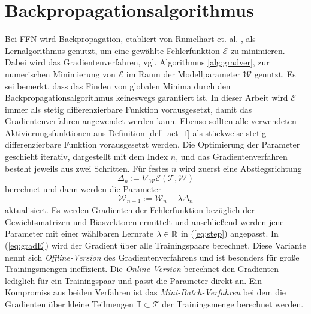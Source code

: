 

 \section*{Backpropagationsalgorithmus}
Bei FFN wird Backpropagation, etabliert von Rumelhart et. al. \cite{MLPbook}, als Lernalgorithmus genutzt, um eine gewählte Fehlerfunktion $\mathcal{E}$ zu minimieren. Dabei wird das Gradientenverfahren, vgl. Algorithmus \ref{alg:gradver}, zur numerischen Minimierung von $\mathcal{E}$ im Raum der Modellparameter $\mathcal{W}$ genutzt. Es sei bemerkt, dass das Finden von globalen Minima durch den Backpropagationsalgorithmus keineswegs garantiert ist.
In dieser Arbeit wird $\mathcal{E}$ immer als stetig differenzierbare Funktion vorausgesetzt, damit das Gradientenverfahren angewendet werden kann. Ebenso sollten alle verwendeten Aktivierungsfunktionen aus Definition \ref{def_act_f} als stückweise stetig differenzierbare Funktion vorausgesetzt werden. 
Die Optimierung der Parameter geschieht iterativ, dargestellt mit dem Index $n$, und das Gradientenverfahren besteht jeweils aus zwei Schritten. Für festes $n$ wird zuerst eine Abstiegsrichtung 
\begin{equation}
    \label{eq:gradE}
    \Delta_n := \nabla_{\mathcal{W}} \mathcal{E}(\mathcal{T},\mathcal{W})
\end{equation} 
berechnet und dann werden die Parameter 
\begin{equation}
    \label{eq:step}
    \mathcal{W}_{n+1}:=\mathcal{W}_n - \lambda \Delta_n
\end{equation}
aktualisiert. Es werden Gradienten der Fehlerfunktion bezüglich der Gewichtsmatrizen und Biasvektoren ermittelt und anschließend werden jene Parameter mit einer wählbaren Lernrate $\lambda \in \mathbb{R}$ in (\ref{eq:step}) angepasst. In (\ref{eq:gradE}) wird der Gradient über alle Trainingspaare berechnet. Diese Variante nennt sich \textit{Offline-Version} des Gradientenverfahrens und ist besonders für große Trainingsmengen ineffizient. Die \textit{Online-Version} berechnet den Gradienten lediglich für ein Trainingspaar und passt die Parameter direkt an. Ein Kompromiss aus beiden Verfahren ist das \textit{Mini-Batch-Verfahren} bei dem die Gradienten über kleine Teilmengen $\mathbb{T} \subset \mathcal{T}$ der Trainingsmenge berechnet werden.
